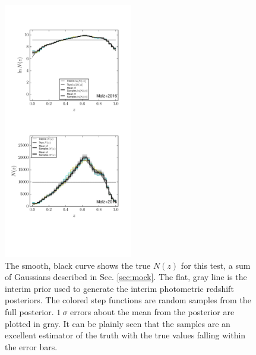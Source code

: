 \documentclass[preprint]{aastex}
\begin{document}
\begin{figure}
\includegraphics[width=0.5\textwidth]{figs/null/samps.pdf}
\caption{The smooth, black curve shows the true $N(z)$ for this test, a sum of 
Gaussians described in Sec. \ref{sec:mock}.  The flat, gray line is the interim 
prior used to generate the interim photometric redshift posteriors.  The 
colored step functions are random samples from the full posterior.  $1\ \sigma$ 
errors about the mean from the posterior are plotted in gray.  It can be 
plainly seen that the samples are an excellent estimator of the truth with the 
true values falling within the error bars.}
\label{fig:null-samp}
\end{figure}
\end{document}
